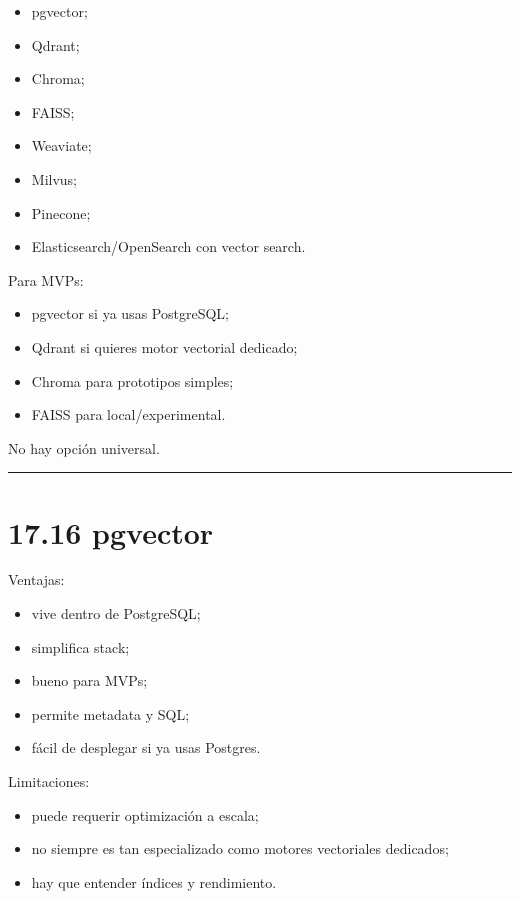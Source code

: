 \begin{itemize}
\tightlist
\item
  pgvector;
\item
  Qdrant;
\item
  Chroma;
\item
  FAISS;
\item
  Weaviate;
\item
  Milvus;
\item
  Pinecone;
\item
  Elasticsearch/OpenSearch con vector search.
\end{itemize}

Para MVPs:

\begin{itemize}
\tightlist
\item
  pgvector si ya usas PostgreSQL;
\item
  Qdrant si quieres motor vectorial dedicado;
\item
  Chroma para prototipos simples;
\item
  FAISS para local/experimental.
\end{itemize}

No hay opción universal.

\begin{center}\rule{0.5\linewidth}{0.5pt}\end{center}

\section{17.16 pgvector}\label{pgvector}

Ventajas:

\begin{itemize}
\tightlist
\item
  vive dentro de PostgreSQL;
\item
  simplifica stack;
\item
  bueno para MVPs;
\item
  permite metadata y SQL;
\item
  fácil de desplegar si ya usas Postgres.
\end{itemize}

Limitaciones:

\begin{itemize}
\tightlist
\item
  puede requerir optimización a escala;
\item
  no siempre es tan especializado como motores vectoriales dedicados;
\item
  hay que entender índices y rendimiento.
\end{itemize}

